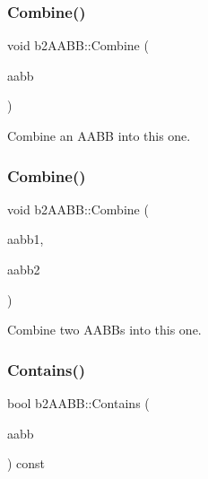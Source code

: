 \subsubsection{\texorpdfstring{Combine()}{Combine()}\hspace{0.1cm}{\footnotesize\ttfamily [1/2]}}
{\footnotesize\ttfamily void b2\+A\+A\+B\+B\+::\+Combine (\begin{DoxyParamCaption}\item[{const \mbox{\hyperlink{structb2_a_a_b_b}{b2\+A\+A\+BB}} \&}]{aabb }\end{DoxyParamCaption})\hspace{0.3cm}{\ttfamily [inline]}}



Combine an A\+A\+BB into this one. 

\mbox{\label{structb2_a_a_b_b_a34b9c7d824df845c10caa9c12ae90452}} 
\subsubsection{\texorpdfstring{Combine()}{Combine()}\hspace{0.1cm}{\footnotesize\ttfamily [2/2]}}
{\footnotesize\ttfamily void b2\+A\+A\+B\+B\+::\+Combine (\begin{DoxyParamCaption}\item[{const \mbox{\hyperlink{structb2_a_a_b_b}{b2\+A\+A\+BB}} \&}]{aabb1,  }\item[{const \mbox{\hyperlink{structb2_a_a_b_b}{b2\+A\+A\+BB}} \&}]{aabb2 }\end{DoxyParamCaption})\hspace{0.3cm}{\ttfamily [inline]}}



Combine two A\+A\+B\+Bs into this one. 

\mbox{\label{structb2_a_a_b_b_acf98175d3a53bca755d5c4852fa85a00}} 
\subsubsection{\texorpdfstring{Contains()}{Contains()}}
{\footnotesize\ttfamily bool b2\+A\+A\+B\+B\+::\+Contains (\begin{DoxyParamCaption}\item[{const \mbox{\hyperlink{structb2_a_a_b_b}{b2\+A\+A\+BB}} \&}]{aabb }\end{DoxyParamCaption}) const\hspace{0.3cm}{\ttfamily [inline]}}



